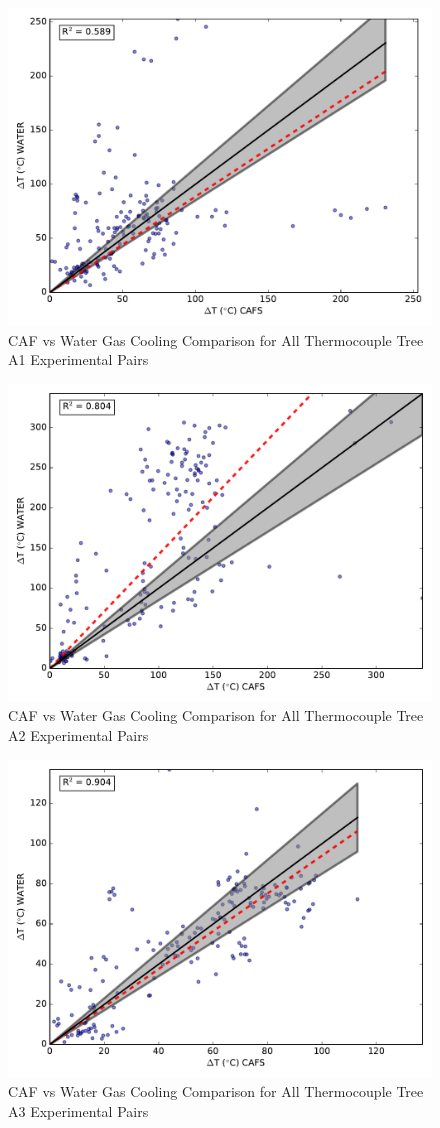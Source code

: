 \documentclass[12pt,oneside]{book}
\begin{document}
\begin{figure}[!ht]
	\includegraphics[width=.7\columnwidth]{../Figures/Gas_Cooling/Combined_A1_scatter}
	\caption{CAF vs Water Gas Cooling Comparison for All Thermocouple Tree A1 Experimental Pairs}
	\label{fig:CAFS_Water_A1_all}
\end{figure}

\begin{figure}[!ht]
	\includegraphics[width=.7\columnwidth]{../Figures/Gas_Cooling/Combined_A2_scatter}
	\caption{CAF vs Water Gas Cooling Comparison for All Thermocouple Tree A2 Experimental Pairs}
	\label{fig:CAFS_Water_A2_all}
\end{figure}

\begin{figure}[!ht]
	\includegraphics[width=.7\columnwidth]{../Figures/Gas_Cooling/Combined_A3_scatter}
	\caption{CAF vs Water Gas Cooling Comparison for All Thermocouple Tree A3 Experimental Pairs}
	\label{fig:CAFS_Water_A3_all}
\end{figure}
\end{document}
